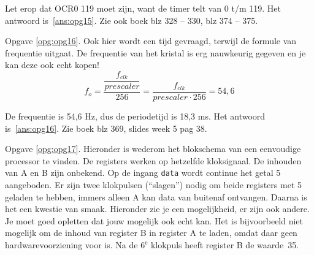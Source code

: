 \documentclass[a4paper,12pt,fleqn,dutch,mimicwordtwentyten]{tisdexam}
\begin{document}
\begin{questions}
Let erop dat OCR0 119 moet zijn, want de timer telt van 0 t/m 119. Het
antwoord is~\ref{ans:opg15}. Zie ook boek blz 328 -- 330, blz 374 -- 375.

\vspace{1em}
Opgave \ref{opg:opg16}.\label{sol:opg16}
Ook hier wordt een tijd gevraagd, terwijl de formule van frequentie uitgaat.
De frequentie van het kristal is erg nauwkeurig gegeven en je kan deze ook
echt kopen!
\begin{equation*}
f_{o} = \dfrac{\dfrac{f_{clk}}{prescaler}}{256} = 
        \dfrac{f_{clk}}{prescaler \cdot 256} = 54,6
\end{equation*}

De frequentie is 54,6 Hz, dus de periodetijd is 18,3 ms. Het antwoord
is~\ref{ans:opg16}. Zie boek blz 369, slides week 5 pag 38.

\vspace{1em}
Opgave \ref{opg:opg17}.\label{sol:opg17}
Hieronder is wederom het blokschema van een eenvoudige processor te vinden.
De registers werken op hetzelfde kloksignaal. De inhouden van A en B zijn
onbekend. Op de ingang \texttt{data} wordt continue het getal 5 aangeboden. Er
zijn twee klokpulsen (``slagen'') nodig om beide registers met 5 geladen te
hebben, immers alleen A kan data van buitenaf ontvangen. Daarna is het een
kwestie van smaak. Hieronder zie je een mogelijkheid, er zijn ook andere. Je
moet goed opletten dat jouw mogelijk ook echt kan. Het is bijvoorbeeld niet
mogelijk om de inhoud van register B in register A te laden, omdat daar geen
hardwarevoorziening voor is. Na de $6^{\text{e}}$ klokpuls heeft register B de
waarde~35.


\end{questions}
\end{document}
